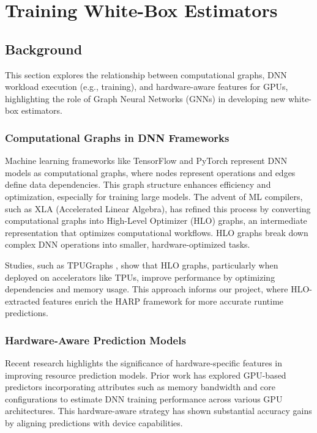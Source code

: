 \section{Training White-Box Estimators}

\subsection{Background}

This section explores the relationship between computational graphs, DNN workload execution (e.g., training), and hardware-aware features for GPUs, highlighting the role of Graph Neural Networks (GNNs) in developing new white-box estimators.

\subsubsection{Computational Graphs in DNN Frameworks}

Machine learning frameworks like TensorFlow and PyTorch represent DNN models as computational graphs, where nodes represent operations and edges define data dependencies. This graph structure enhances efficiency and optimization, especially for training large models. The advent of ML compilers, such as XLA (Accelerated Linear Algebra), has refined this process by converting computational graphs into High-Level Optimizer (HLO) graphs, an intermediate representation that optimizes computational workflows. HLO graphs break down complex DNN operations into smaller, hardware-optimized tasks.  

Studies, such as TPUGraphs \cite{phothilimthana2023tpugraphs}, show that HLO graphs, particularly when deployed on accelerators like TPUs, improve performance by optimizing dependencies and memory usage. This approach informs our project, where HLO-extracted features enrich the HARP framework for more accurate runtime predictions.

\subsubsection{Hardware-Aware Prediction Models}

Recent research highlights the significance of hardware-specific features in improving resource prediction models. Prior work \cite{zhang2023gpu} has explored GPU-based predictors incorporating attributes such as memory bandwidth and core configurations to estimate DNN training performance across various GPU architectures. This hardware-aware strategy has shown substantial accuracy gains by aligning predictions with device capabilities.

